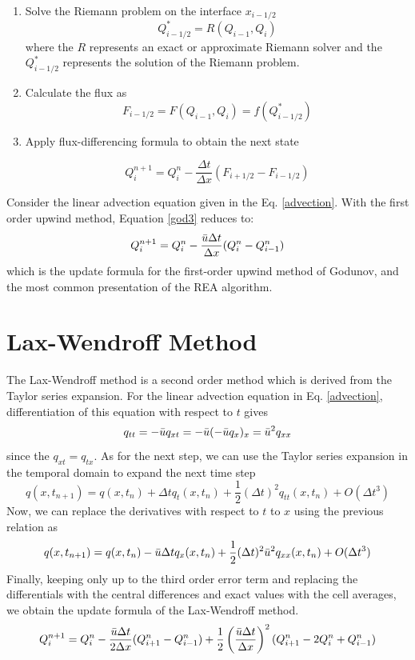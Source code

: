 \documentclass[journal,onecolumn]{IEEEtran}
\begin{document}
\begin{enumerate}
    \item Solve the Riemann problem on the interface $x_{i-1/2}$
    \begin{equation} \label{god1}
        Q^*_{i-1/2} = R(Q_{i-1}, Q_{i})
    \end{equation}
    where the $R$ represents an exact or approximate Riemann solver and the $Q^*_{i-1/2}$ represents the solution of the Riemann problem.
    
    \item Calculate the flux as
     \begin{equation} \label{god2}
        {F}_{i-1/2} = F(Q_{i-1}, Q_i) = f(Q^*_{i-1/2})
     \end{equation}
    \item Apply flux-differencing formula to obtain the next state
    
    \begin{equation} \label{god3}
         Q_i^{n+1} = Q_i^{n} - \frac{\Delta t}{\Delta x}({F}_{i+1/2} - {F}_{i-1/2})
    \end{equation}
    
\end{enumerate}

Consider the linear advection equation given in the Eq. \ref{advection}. With the first order upwind method, Equation \ref{god3} reduces to:
$$
    Q_i^{n+1} = Q_i^{n} - \frac{\Bar{u}\Delta t}{\Delta x}({Q}^n_{i} - {Q}^n_{i-1})
$$
which is the update formula for the first-order upwind method of Godunov, and the most common presentation of the REA algorithm.

\section{Lax-Wendroff Method}
The Lax-Wendroff method is a second order method which is derived from the Taylor series expansion. For the linear advection equation in Eq. \ref{advection}, differentiation of this equation with respect to $t$ gives
$$
q_{tt} = - \Bar{u} q_{xt} = -\Bar{u}(-\Bar{u} q_x)_x = \Bar{u}^2 q_{xx}
$$
since the $q_{xt} = q_{tx}$. As for the next step, we can use the Taylor series expansion in the temporal domain to expand the next time step
$$
q(x, t_{n+1}) = q(x, t_n) + \Delta t q_t(x, t_n) + \frac{1}{2}(\Delta t)^2 q_{tt}(x, t_n) + O(\Delta t^3)
$$
Now, we can replace the derivatives with respect to $t$ to $x$ using the previous relation as
$$
q(x, t_{n+1}) = q(x, t_n) - \Bar{u} \Delta t q_x(x, t_n) + \frac{1}{2}(\Delta t)^2 \Bar{u}^2 q_{xx}(x, t_n) + O(\Delta t^3)
$$
Finally, keeping only up to the third order error term and replacing the differentials with the central differences and exact values with the cell averages, we obtain the update formula of the Lax-Wendroff method. 
$$
    Q_i^{n+1} = Q_i^{n} - \frac{\Bar{u} \Delta t}{2\Delta x}(Q^n_{i+1}-Q^n_{i-1}) + \frac{1}{2}\left(\frac{\Bar{u}\Delta t}{\Delta x}\right)^2 (Q^n_{i+1} - 2Q^n_{i} +  Q^n_{i-1})
$$
\end{document}
